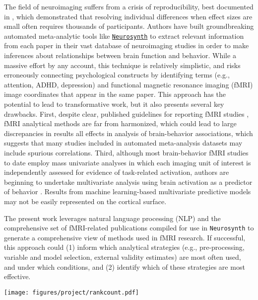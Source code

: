 The field of neuroimaging suffers from a crisis of reproducibility, best documented in \cite{MarekEtAl2022}, which demonstrated that resolving individual differences when effect sizes are small often requires thousands of participants. Authors have built groundbreaking automated meta-analytic tools like \href{https://neurosynth.org/}{\texttt{Neurosynth}} \cite{YarkoniEtAl2011} to extract relevant information from each paper in their vast database of neuroimaging studies in order to make inferences about relationships between brain function and behavior. While a massive effort by any account, this technique is relatively simplistic, and risks erroneously connecting psychological constructs by identifying terms (e.g., attention, ADHD, depression) and functional magnetic resonance imaging (fMRI) image coordinates that appear in the same paper. This approach has the potential to lead to transformative work, but it also presents several key drawbacks. First, despite clear, published guidelines for reporting fMRI studies \cite{PoldrackEtAl2008}, fMRI analytical methods are far from harmonized, which could lead to large discrepancies in results \cite{Botvinik-NezerEtAl2020} all effects in analysis of brain-behavior associations, which suggests that many studies included in automated meta-analysis datasets may include spurious correlations. Third, although most brain-behavior fMRI studies to date employ mass univariate analyses in which each imaging unit of interest is independently assessed for evidence of task-related activation, authors are beginning to undertake multivariate analysis using brain activation as a predictor of behavior \cite[e.g.,][]{YuanEtAl2023}. Results from machine learning-based multivariate predictive models may not be easily represented on the cortical surface. 	

The present work leverages natural language processing (NLP)  and the comprehensive set of fMRI-related publications compiled for use in \texttt{Neurosynth} \cite{YarkoniEtAl2011} to generate a comprehensive view of methods used in fMRI research. If successful, this approach could (1) inform which analytical strategies (e.g., pre-processing, variable and model selection, external validity estimates) are most often used, and under which conditions, and (2) identify which of these strategies are most effective. 



\begin{figure*}[tp!]
  \centering	
    \texttt{[image: figures/project/rankcount.pdf]}  
  \caption{
  }
  \label{fig:papertag.}
\end{figure*}

